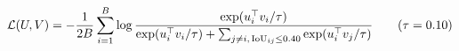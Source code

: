 \documentclass[preview]{standalone}
\begin{document}
\begin{align*}
\special{dvisvgm:raw <g id='unique000'>}\mathcal{L}(U,V) = -\frac{1}{2B}\sum_{i=1}^{B} \log \frac{\exp(u_i^\top v_i / \tau)}{\exp(u_i^\top v_i / \tau) + \sum_{j \neq i,\, \text{IoU}_{ij} \le 0.40} \exp(u_i^\top v_j / \tau)} \qquad (\tau = 0.10)\special{dvisvgm:raw </g>}
\end{align*}
\end{document}
